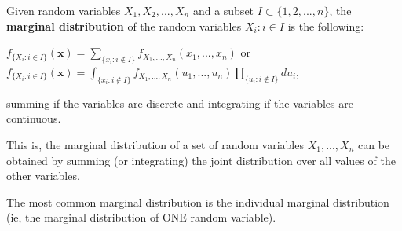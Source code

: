 \documentclass[12pt]{article}
\begin{document}
Given random variables $X_1, X_2, ... , X_n$ and a subset $I \subset \{1,2,...,n\}$, the \textbf{marginal distribution} of the random variables ${X_i : i \in I}$ is the following: \\

\par$f_{\{X_i : i \in I\}}(\mathbf{x}) = \sum_{\{x_i : i \notin I\}}^{}{ f_{X_1,...,X_n}(x_1,...,x_n) }$  or\\
$f_{\{X_i : i \in I\}}(\mathbf{x}) = \int_{\{x_i : i \notin I\}}^{}{ f_{X_1,...,X_n}(u_1,...,u_n) \prod_{ \{u_i : i \notin I\} }^{} du_i}$, \\
\par
summing if the variables are discrete and integrating if the variables are continuous.\\
\par
This is, the marginal distribution of a set of random variables $X_1,...,X_n$ can be obtained by summing (or integrating) the joint distribution over all values of the other variables.\\
\par
The most common marginal distribution is the individual marginal distribution (ie, the marginal distribution of ONE random variable).
\end{document}
